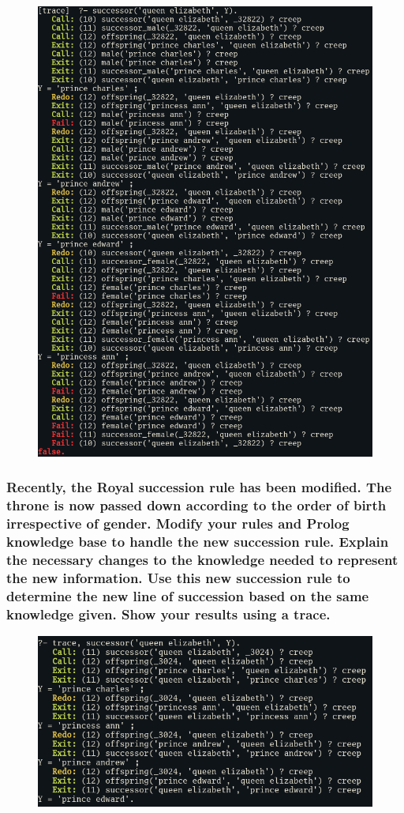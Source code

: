 \documentclass{article}
\begin{document}
\begin{figure}[H]
\centering
\includegraphics[width = \textwidth]{./2a.png}
\end{figure}

\subsubsection*{Recently,  the  Royal  succession  rule  has  been modified.  The  throne  is  now  passed down according  to  the  order  of  birth  irrespective  of  gender.  Modify  your  rules  and Prolog knowledge  base  to  handle  the  new  succession  rule.  Explain  the  necessary changes  to  the knowledge  needed  to represent  the  new  information.  Use  this  new succession  rule  to determine the new line of succession based on the same knowledge given. Show your results using a trace.}

\begin{figure}[H]
\centering
\includegraphics[width = \textwidth]{./2b.png}
\end{figure}
\end{document}
